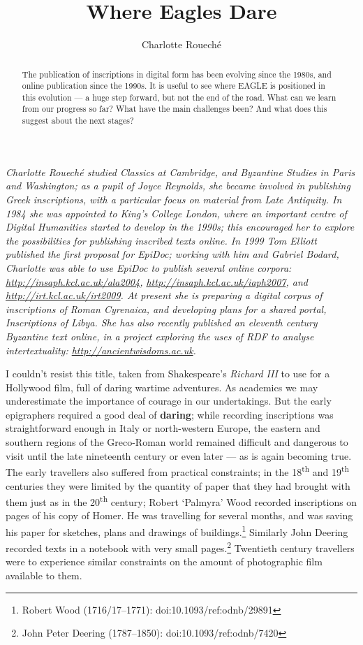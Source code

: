 \documentclass[amsthm,ebook]{saparticle}
\title{Where Eagles Dare}
\author[]{Charlotte Roueché\corref{first}}
\begin{document}
\maketitle
\begin{abstract}
The publication of inscriptions in digital form has been evolving since the 1980s, and online publication since the 1990s. It is useful to see where EAGLE is positioned in this evolution --- a huge step forward, but not the end of the road. What can we learn from our progress so far? What have the main challenges been? And what does this suggest about the next stages?

\end{abstract}

{\small \emph{Charlotte Roueché studied Classics at Cambridge, and Byzantine Studies in Paris and Washington; as a pupil of Joyce Reynolds, she became involved in publishing Greek inscriptions, with a particular focus on material from Late Antiquity. In 1984 she was appointed to King's College London, where an important centre of Digital Humanities started to develop in the 1990s; this encouraged her to explore the possibilities for publishing inscribed texts online. In 1999 Tom Elliott published the first proposal for EpiDoc; working with him and Gabriel Bodard, Charlotte was able to use EpiDoc to publish several online corpora: \url{http://insaph.kcl.ac.uk/ala2004}, \url{http://insaph.kcl.ac.uk/iaph2007}, and \url{http://irt.kcl.ac.uk/irt2009}. At present she is preparing a digital corpus of inscriptions of Roman Cyrenaica, and developing plans for a shared portal, Inscriptions of Libya. She has also recently published an eleventh century Byzantine text online, in a project exploring the uses of RDF to analyse intertextuality: \url{http://ancientwisdoms.ac.uk}.}}

\vspace{1cm}
I couldn't resist this title, taken from Shakespeare's \emph{Richard III} to use for a Hollywood film, full of daring wartime
adventures. As academics we may underestimate the importance of courage in our undertakings. But the early epigraphers
required a good deal of \textbf{daring}; while recording inscriptions was straightforward enough in Italy or north-western
Europe, the eastern and southern regions of the Greco-Roman world remained difficult and dangerous to visit until the
late nineteenth century or even later --- as is again becoming true. The early travellers also suffered from practical
constraints; in the 18\textsuperscript{th} and 19\textsuperscript{th} centuries they were limited by the quantity of paper that they had brought with them
just as in the 20\textsuperscript{th} century; Robert `Palmyra' Wood recorded inscriptions on pages of his copy of Homer. He was
travelling for several months, and was saving his paper for sketches, plans and drawings of buildings.\footnote{ Robert
Wood (1716/17–1771): doi:10.1093/ref:odnb/29891} Similarly John Deering recorded texts in a notebook with very small
pages.\footnote{ John Peter Deering (1787–1850): doi:10.1093/ref:odnb/7420} Twentieth century travellers were to
experience similar constraints on the amount of photographic film available to them.
\end{document}
